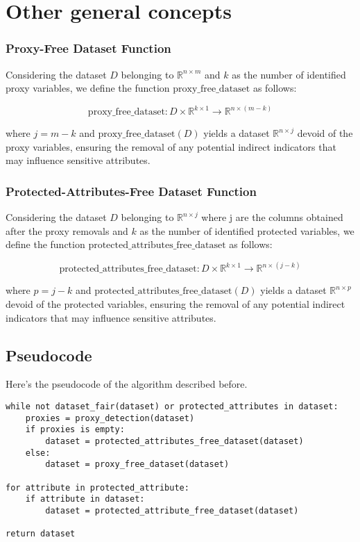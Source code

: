 \documentclass[12pt,a4paper,openright,twoside]{book}
\begin{document}
\section{Other general concepts}

\subsubsection{Proxy-Free Dataset Function}

Considering the dataset \( D \) belonging to \( \mathbb{R}^{n \times m} \) and \( k \) as the number of identified proxy variables, we define the function \( \text{proxy\_free\_dataset} \) as follows:

\[
\text{proxy\_free\_dataset}: D \times \mathbb{R}^{k \times 1} \rightarrow \mathbb{R}^{n \times (m - k)}
\]

where \( j = m - k \) and \( \text{proxy\_free\_dataset}(D) \) yields a dataset \( \mathbb{R}^{n \times j} \) devoid of the proxy variables, ensuring the removal of any potential indirect indicators that may influence sensitive attributes.

\subsubsection{Protected-Attributes-Free Dataset Function}

Considering the dataset \( D \) belonging to \( \mathbb{R}^{n \times j} \) where j are the columns obtained after the proxy removals and \( k \) as the number of identified protected variables, we define the function \( \text{protected\_attributes\_free\_dataset} \) as follows:

\[
\text{protected\_attributes\_free\_dataset}: D \times \mathbb{R}^{k \times 1} \rightarrow \mathbb{R}^{n \times (j - k)}
\]

where \( p = j - k \) and \( \text{protected\_attributes\_free\_dataset}(D) \) yields a dataset \( \mathbb{R}^{n \times p} \) devoid of the protected variables, ensuring the removal of any potential indirect indicators that may influence sensitive attributes.

\subsection{Pseudocode}
Here's the pseudocode of the algorithm described before. \\

\begin{verbatim}
while not dataset_fair(dataset) or protected_attributes in dataset:
	proxies = proxy_detection(dataset)
	if proxies is empty:
		dataset = protected_attributes_free_dataset(dataset)
	else:
		dataset = proxy_free_dataset(dataset)

for attribute in protected_attribute:
	if attribute in dataset:
		dataset = protected_attribute_free_dataset(dataset)

return dataset
\end{verbatim}
\end{document}

